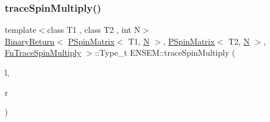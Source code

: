 \subsubsection{\texorpdfstring{traceSpinMultiply()}{traceSpinMultiply()}\hspace{0.1cm}{\footnotesize\ttfamily [1/3]}}
{\footnotesize\ttfamily template$<$class T1 , class T2 , int N$>$ \\
\mbox{\hyperlink{structENSEM_1_1BinaryReturn}{Binary\+Return}}$<$ \mbox{\hyperlink{classENSEM_1_1PSpinMatrix}{P\+Spin\+Matrix}}$<$ T1, \mbox{\hyperlink{adat__devel_2lib_2hadron_2operator__name__util_8cc_a7722c8ecbb62d99aee7ce68b1752f337}{N}} $>$, \mbox{\hyperlink{classENSEM_1_1PSpinMatrix}{P\+Spin\+Matrix}}$<$ T2, \mbox{\hyperlink{adat__devel_2lib_2hadron_2operator__name__util_8cc_a7722c8ecbb62d99aee7ce68b1752f337}{N}} $>$, \mbox{\hyperlink{structENSEM_1_1FnTraceSpinMultiply}{Fn\+Trace\+Spin\+Multiply}} $>$\+::Type\+\_\+t E\+N\+S\+E\+M\+::trace\+Spin\+Multiply (\begin{DoxyParamCaption}\item[{const \mbox{\hyperlink{classENSEM_1_1PSpinMatrix}{P\+Spin\+Matrix}}$<$ T1, \mbox{\hyperlink{adat__devel_2lib_2hadron_2operator__name__util_8cc_a7722c8ecbb62d99aee7ce68b1752f337}{N}} $>$ \&}]{l,  }\item[{const \mbox{\hyperlink{classENSEM_1_1PSpinMatrix}{P\+Spin\+Matrix}}$<$ T2, \mbox{\hyperlink{adat__devel_2lib_2hadron_2operator__name__util_8cc_a7722c8ecbb62d99aee7ce68b1752f337}{N}} $>$ \&}]{r }\end{DoxyParamCaption})\hspace{0.3cm}{\ttfamily [inline]}}

\mbox{\label{group__primspinmatrix_ga397616dd6ad517f1cf893903cd93c2c8}} 
